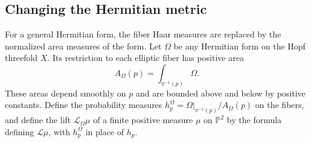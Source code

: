 \subsection{Changing the Hermitian metric}

For a general Hermitian form, the fiber Haar measures are replaced by the normalized area measures of the form. Let $\Omega$ be any Hermitian form on the Hopf threefold $X$. Its restriction to each elliptic fiber has positive area
\[
 A_\Omega(p)=\int_{\pi^{-1}(p)}\Omega.
\]
These areas depend smoothly on $p$ and are bounded above and below by positive constants. Define the probability measures $h_p^\Omega=\Omega|_{\pi^{-1}(p)}/A_\Omega(p)$ on the fibers, and define the lift $\mathcal L_\Omega\mu$ of a finite positive measure $\mu$ on $\mathbb P^2$ by the formula defining $\mathcal L\mu$, with $h_p^\Omega$ in place of $h_p$.

